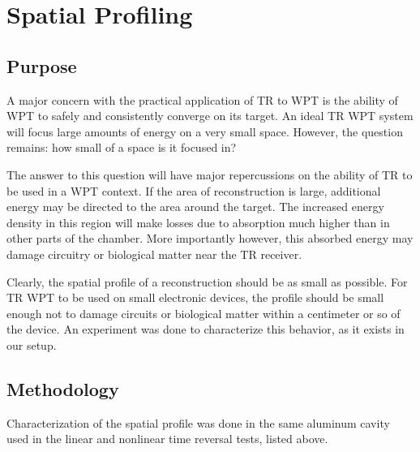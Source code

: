 \section{Spatial Profiling}
\label{sec:spatial-profile}

\subsection{Purpose}

A major concern with the practical application of TR to WPT is the ability of WPT to safely and consistently converge on its target.  An ideal TR WPT system will focus large amounts of energy on a very small space.  However, the question remains: how small of a space is it focused in?

The answer to this question will have major repercussions on the ability of TR to be used in a WPT context.  If the area of reconstruction is large, additional energy may be directed to the area around the target.  The increased energy density in this region will make losses due to absorption much higher than in other parts of the chamber.  More importantly however, this absorbed energy may damage circuitry or biological matter near the TR receiver.

Clearly, the spatial profile of a reconstruction should be as small as possible.  For TR WPT to be used on small electronic devices, the profile should be small enough not to damage circuits or biological matter within a centimeter or so of the device.  An experiment was done to characterize this behavior, as it exists in our setup.

\subsection{Methodology}

Characterization of the spatial profile was done in the same aluminum cavity used in the linear and nonlinear time reversal tests, listed above.

